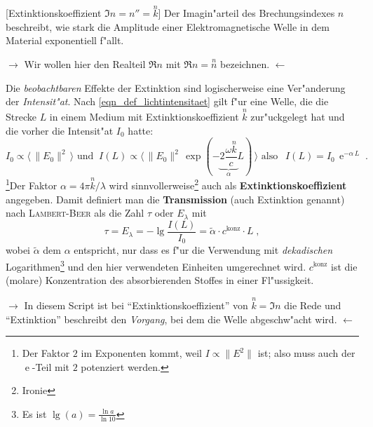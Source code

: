 \documentclass[twoside,a4paper]{book}
\newcommand{\E}{\ensuremath{\operatorname{e}}}
\newenvironment{Def}[1][]{%
\definecolor{shadethmcolor}{rgb}{.95,.95,.95}%
\definecolor{shaderulecolor}{rgb}{0.8,0.8,0.8}%
\setlength{\shadeboxrule}{1pt}%
\begin{Defi}[#1]%
 }{\end{Defi}}
\newenvironment*{Einschub}[0]{$\rightarrow$ \indent}{$\leftarrow$}
\begin{document}
\newcommand{\exko}[0]{\ensuremath{\stackrel{n}{k}}}
\begin{Def}
   [Extinktionskoeffizient $\Im n = n'' = \exko$] Der Imagin"arteil
   des Brechungsindexes $n$ beschreibt, wie stark die Amplitude einer
   Elektromagnetische Welle in dem Material exponentiell f"allt.
\end{Def}

\newcommand{\ren}[0]{\ensuremath{\stackrel{n}{n}}}
\begin{Einschub}
   Wir wollen hier den Realteil $\Re n$ mit $\Re n = \ren$ bezeichnen.
\end{Einschub}


Die \emph{beobachtbaren} Effekte der Extinktion sind logischerweise
eine Ver"anderung der \emph{Intensit"at}. Nach
\eqref{eqn_def_lichtintensitaet} gilt f"ur eine Welle, die die Strecke
$L$ in einem Medium mit
Extinktionskoeffizient $\exko$  zur"uckgelegt hat und die vorher die
Intensit"at $I_0$ hatte:
\begin{equation}
   \label{eq:30}
   I_0 \propto \langle \,\| E_0 \|^2\,  \rangle \text{ und } ~ 
I(L) \propto \langle \,\| E_0 \|^2 \, \exp ( {- \underbrace{ 2 \frac{\omega \exko}{c}}_{\alpha}
     L} ) \,  \rangle
\text{ also }  ~ ~ I(L) = I_0 \, \E^{- \alpha \, L} \;.
\end{equation}
\footnote{Der Faktor $2$ im Exponenten kommt, weil $I \propto \|
  E^2\|$ ist; also muss auch der $\E$-Teil mit $2$ potenziert
  werden.}Der Faktor $\alpha = 4\pi\exko/\lambda$ wird
sinnvollerweise\footnote{Ironie} auch als
\textbf{Extinktionskoeffizient} angegeben. Damit definiert man die
\textbf{Transmission} (auch Extinktion genannt) nach
\textsc{Lambert-Beer} als die Zahl $\tau$ oder $E_\lambda$ mit
\begin{equation}
   \label{eq:31}
   \tau = E_\lambda = - \lg \frac{I(L)}{I_0} = \tilde\alpha \cdot c^\text{konz} \cdot L \;,
\end{equation}
wobei $\tilde \alpha$ dem $\alpha$ entspricht, nur dass es f"ur die
Verwendung mit \emph{dekadischen} Logarithmen\footnote{Es
  ist $\lg(a) = \frac{\ln a}{\ln 10}$} und den hier
verwendeten Einheiten umgerechnet wird. $c^\text{konz}$
ist die (molare) Konzentration des absorbierenden Stoffes in einer
Fl"ussigkeit.

\begin{Einschub}
   In diesem Script ist bei "`Extinktionskoeffizient"' von $\exko =
   \Im n$ die Rede und "`Extinktion"' beschreibt den \emph{Vorgang}, bei dem
   die Welle abgeschw"acht wird.
\end{Einschub}
\end{document}
